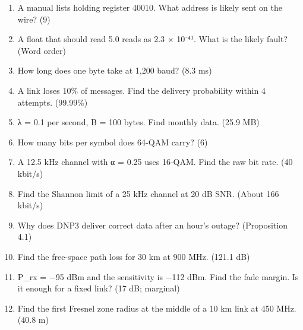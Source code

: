 \begin{enumerate}
\item A manual lists holding register 40010. What address is likely sent on the wire? (9)
\item A float that should read 5.0 reads as 2.3 × 10⁻⁴¹. What is the likely fault? (Word order)
\item How long does one byte take at 1,200 baud? (8.3 ms)
\item A link loses 10\% of messages. Find the delivery probability within 4 attempts. (99.99\%)
\item λ = 0.1 per second, B = 100 bytes. Find monthly data. (25.9 MB)
\item How many bits per symbol does 64-QAM carry? (6)
\item A 12.5 kHz channel with α = 0.25 uses 16-QAM. Find the raw bit rate. (40 kbit/s)
\item Find the Shannon limit of a 25 kHz channel at 20 dB SNR. (About 166 kbit/s)
\item Why does DNP3 deliver correct data after an hour's outage? (Proposition 4.1)
\item Find the free-space path loss for 30 km at 900 MHz. (121.1 dB)
\item P\_rx = −95 dBm and the sensitivity is −112 dBm. Find the fade margin. Is it enough for a fixed link? (17 dB; marginal)
\item Find the first Fresnel zone radius at the middle of a 10 km link at 450 MHz. (40.8 m)
\end{enumerate}
